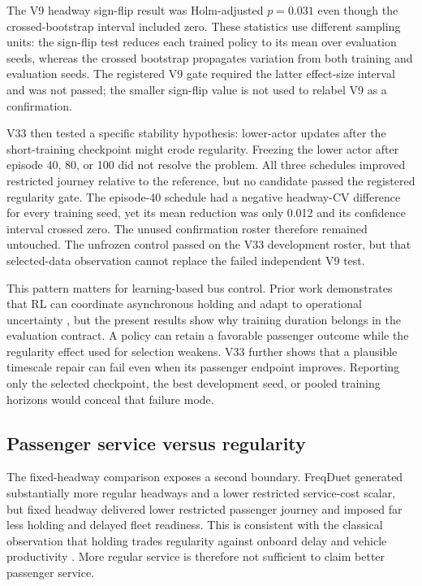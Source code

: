\documentclass[preprint,12pt,authoryear,nopreprintline]{elsarticle}
\begin{document}
The V9 headway sign-flip result was Holm-adjusted \(p=0.031\) even
though the crossed-bootstrap interval included zero. These statistics
use different sampling units: the sign-flip test reduces each trained
policy to its mean over evaluation seeds, whereas the crossed bootstrap
propagates variation from both training and evaluation seeds. The
registered V9 gate required the latter effect-size interval and was not
passed; the smaller sign-flip value is not used to relabel V9 as a
confirmation.

V33 then tested a specific stability hypothesis: lower-actor updates
after the short-training checkpoint might erode regularity. Freezing the
lower actor after episode 40, 80, or 100 did not resolve the problem.
All three schedules improved restricted journey relative to the
reference, but no candidate passed the registered regularity gate. The
episode-40 schedule had a negative headway-CV difference for every
training seed, yet its mean reduction was only 0.012 and its confidence
interval crossed zero. The unused confirmation roster therefore remained
untouched. The unfrozen control passed on the V33 development roster,
but that selected-data observation cannot replace the failed independent
V9 test.

This pattern matters for learning-based bus control. Prior work
demonstrates that RL can coordinate asynchronous holding and adapt to
operational uncertainty
\citep{wang2020dynamic, wang2021asynchronous, wang2023robust}, but the
present results show why training duration belongs in the evaluation
contract. A policy can retain a favorable passenger outcome while the
regularity effect used for selection weakens. V33 further shows that a
plausible timescale repair can fail even when its passenger endpoint
improves. Reporting only the selected checkpoint, the best development
seed, or pooled training horizons would conceal that failure mode.

\subsection{Passenger service versus
regularity}\label{passenger-service-versus-regularity}

The fixed-headway comparison exposes a second boundary. FreqDuet
generated substantially more regular headways and a lower restricted
service-cost scalar, but fixed headway delivered lower restricted
passenger journey and imposed far less holding and delayed fleet
readiness. This is consistent with the classical observation that
holding trades regularity against onboard delay and vehicle productivity
\citep{daganzo2009headway, xuan2011dynamic, berrebi2018comparing}. More
regular service is therefore not sufficient to claim better passenger
service.
\end{document}
